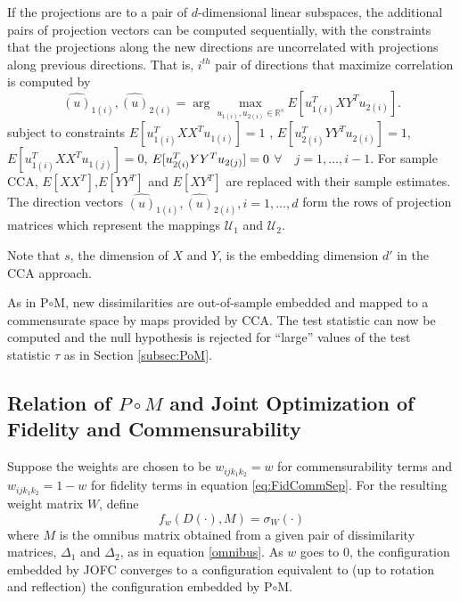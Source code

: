 \documentclass[11pt]{article} %
\begin{document}
If the projections are to a pair of $d$-dimensional linear subspaces, the additional pairs of projection vectors can be computed sequentially, with the constraints that the projections along the new directions are uncorrelated with  projections along previous directions. That is, $i^{th}$ pair of directions  that maximize correlation is computed by 
$$
{\hat{(u)}_{1(i)},\hat{(u)}_{2(i)}}=\arg\max_{u_{1(i)},u_{2(i)}\in\mathbb{R}^s} {E[u_{1(i)}^{T}XY^Tu_{2(i)}]}.$$ subject to constraints $E[{u_{1(i)}^{T}XX^T u_{1(i)}}]=1$ , $E[{u_{2(i)}^{T}YY^T u_{2(i)}}]=1$, $E[{u_{1(i)}^{T}XX^T u_{1(j)}}]=0$,  
   $ E[{u_{2(i)}^{T}YY^T u_{2(j)}}]=\nolinebreak0$ $\forall \quad  j=1,\ldots,i-1$. For sample CCA, $E[XX^T]$,$E[YY^T]$ and $E[XY^T]$ are replaced with their sample estimates. The direction vectors ${\hat{(u)}_{1(i)},\hat{(u)}_{2(i)}}, i=1,\ldots,d $ form the rows of projection matrices which represent the mappings $\mathcal{U}_1$ and $\mathcal{U}_2$. 


Note that $s$, the dimension of $X$ and $Y$, is the embedding dimension $d'$  in the CCA approach. 


As in P$ \circ $M, new dissimilarities are out-of-sample embedded and mapped to a commensurate  space by maps provided by CCA. The test statistic   can now be computed and  the null hypothesis is rejected for ``large'' values of the test statistic $\tau$  as in Section \ref{subsec:PoM}.


\subsection{Relation of $P\circ M$ and Joint Optimization of Fidelity and Commensurability} 

Suppose the weights are chosen to be $w_{ijk_1k_2}=w$ for commensurability terms and $w_{ijk_1k_2}=1-w$ for fidelity terms in equation \eqref{eq:FidCommSep}. For the resulting weight matrix $W$, define 
\begin{equation}
f_w(D(\cdot),M) = \sigma_W(\cdot) \label{fid-comm-tradeoff-func}
\end{equation}
 where $M$ is the omnibus matrix obtained from  a given pair of dissimilarity matrices, $\Delta_1$ and $\Delta_2$, as in equation \eqref{omnibus}.   As $w$ goes to 0, the configuration embedded by JOFC converges to a configuration equivalent to (up to rotation and reflection)  the configuration embedded by P$\circ$M.
\end{document}
